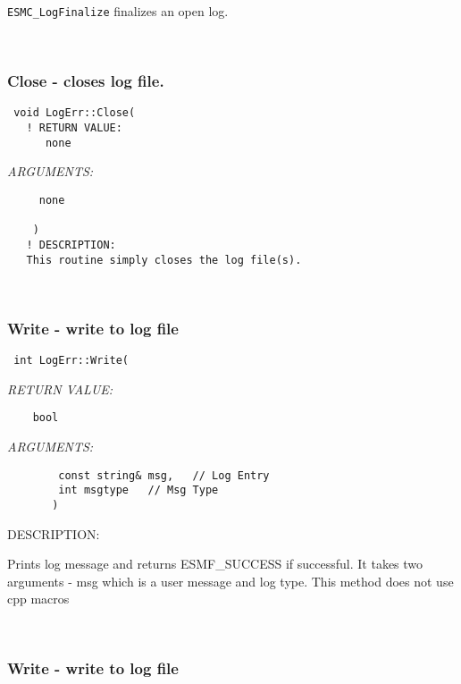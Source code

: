 {   {\tt ESMC\_LogFinalize} finalizes an open log. 
 
\mbox{}\hrulefill\ 
 
\subsubsection [Close] {Close - closes log file.}


  
\begin{verbatim} 
 void LogErr::Close(
   ! RETURN VALUE:
      none\end{verbatim}{\em ARGUMENTS:}
\begin{verbatim}     none
 
    )
   ! DESCRIPTION:
   This routine simply closes the log file(s).\end{verbatim}
 
 
\mbox{}\hrulefill\ 
 
\subsubsection [Write] {Write - write to log file}


  
\begin{verbatim} int LogErr::Write(
 \end{verbatim}{\em RETURN VALUE:}
\begin{verbatim}    bool\end{verbatim}{\em ARGUMENTS:}
\begin{verbatim}        const string& msg,   // Log Entry
        int msgtype   // Msg Type
       )\end{verbatim}
{\sf DESCRIPTION:\\ }


   Prints log message and returns ESMF_SUCCESS if successful.  It takes two
   arguments -
   msg which is a user message and log type.  This method does not use cpp
   macros 
 
\mbox{}\hrulefill\ 
 
\subsubsection [Write] {Write - write to log file}


}
